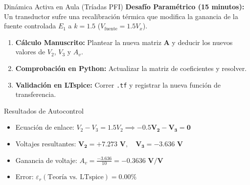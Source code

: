 \documentclass[aspectratio=169, 10pt]{beamer}
\begin{document}
\begin{frame}{Dinámica Activa en Aula (Tríadas PFI)}
    \small
    \textbf{Desafío Paramétrico (15 minutos):}
    Un transductor sufre una recalibración térmica que modifica la ganancia de la fuente controlada $E_1$ a $k = 1.5$ ($V_{\text{fuente}} = 1.5 V_x$).
    
    \begin{enumerate}
        \item \textbf{Cálculo Manuscrito:} Plantear la nueva matriz $\mathbf{A}$ y deducir los nuevos valores de $V_2$, $V_3$ y $A_v$.
        \item \textbf{Comprobación en Python:} Actualizar la matriz de coeficientes y resolver.
        \item \textbf{Validación en LTspice:} Correr \texttt{.tf} y registrar la nueva función de transferencia.
    \end{enumerate}
    
    \vspace{0.2cm}
    \begin{alertblock}{Resultados de Autocontrol}
        \begin{itemize}
            \item Ecuación de enlace: $V_2 - V_3 = 1.5 V_2 \implies \mathbf{-0.5 V_2 - V_3 = 0}$
            \item Voltajes resultantes: $\mathbf{V_2 = +7.273\text{ V}}, \quad \mathbf{V_3 = -3.636\text{ V}}$
            \item Ganancia de voltaje: $A_v = \frac{-3.636}{10} = \mathbf{-0.3636\text{ V/V}}$
            \item Error: $\varepsilon_r (\text{Teoría vs. LTspice}) = 0.00\%$
        \end{itemize}
    \end{alertblock}
\end{frame}
\end{document}
